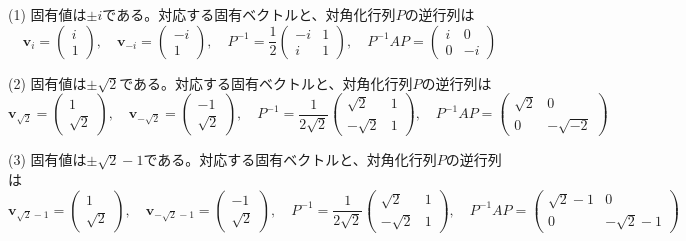 (1) 固有値は$\pm i$である。対応する固有ベクトルと、対角化行列$P$の逆行列は
\[
\bm{v}_i = 
\begin{pmatrix}
i \\
1
\end{pmatrix}, \quad
\bm{v}_{-i} = 
\begin{pmatrix}
-i \\
1
\end{pmatrix}, \quad
P^{-1} = 
\frac{1}{2}
\begin{pmatrix}
-i & 1 \\
i & 1
\end{pmatrix}, \quad
P^{-1} AP =
\begin{pmatrix}
i & 0 \\
0 & -i
\end{pmatrix}
\]

(2) 固有値は$\pm\sqrt{2}$である。対応する固有ベクトルと、対角化行列$P$の逆行列は
\[
\bm{v}_{\sqrt{2}} = 
\begin{pmatrix}
1 \\
\sqrt{2}
\end{pmatrix}, \quad
\bm{v}_{-\sqrt{2}} = 
\begin{pmatrix}
-1 \\
\sqrt{2}
\end{pmatrix}, \quad
P^{-1} = 
\frac{1}{2\sqrt{2}}
\begin{pmatrix}
\sqrt{2} & 1 \\
-\sqrt{2} & 1
\end{pmatrix}, \quad
P^{-1} AP =
\begin{pmatrix}
\sqrt{2} & 0 \\
0 & -\sqrt{-2}
\end{pmatrix}
\]

(3) 固有値は$\pm \sqrt{2} - 1$である。対応する固有ベクトルと、対角化行列$P$の逆行列は %
\[
\bm{v}_{\sqrt{2} - 1} = 
\begin{pmatrix}
1 \\
\sqrt{2}
\end{pmatrix}, \quad
\bm{v}_{-\sqrt{2} - 1} = 
\begin{pmatrix}
-1 \\
\sqrt{2}
\end{pmatrix}, \quad
P^{-1} = 
\frac{1}{2\sqrt{2}}
\begin{pmatrix}
\sqrt{2} & 1 \\
-\sqrt{2} & 1
\end{pmatrix}, \quad
P^{-1} AP =
\begin{pmatrix}
\sqrt{2} - 1 & 0 \\
0 & - \sqrt{2} - 1
\end{pmatrix}
\]

